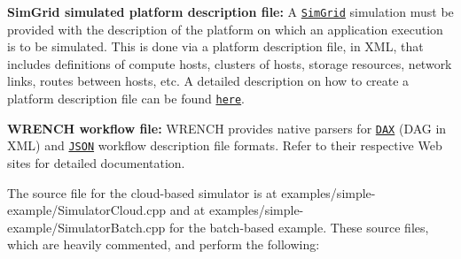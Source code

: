 \begin{DoxyItemize}
\item {\bfseries Sim\+Grid simulated platform description file\+:} A \href{http://simgrid.gforge.inria.fr}{\tt Sim\+Grid} simulation must be provided with the description of the platform on which an application execution is to be simulated. This is done via a platform description file, in X\+ML, that includes definitions of compute hosts, clusters of hosts, storage resources, network links, routes between hosts, etc. A detailed description on how to create a platform description file can be found \href{http://simgrid.gforge.inria.fr/simgrid/3.19/doc/platform.html}{\tt here}.
\item {\bfseries W\+R\+E\+N\+CH workflow file\+:} W\+R\+E\+N\+CH provides native parsers for \href{http://workflowarchive.org}{\tt D\+AX} (D\+AG in X\+ML) and \href{https://github.com/wrench-project/wrench/tree/master/doc/schemas}{\tt J\+S\+ON} workflow description file formats. Refer to their respective Web sites for detailed documentation.
\end{DoxyItemize}

The source file for the cloud-\/based simulator is at {\ttfamily examples/simple-\/example/\+Simulator\+Cloud.\+cpp} and at {\ttfamily examples/simple-\/example/\+Simulator\+Batch.\+cpp} for the batch-\/based example. These source files, which are heavily commented, and perform the following\+:


